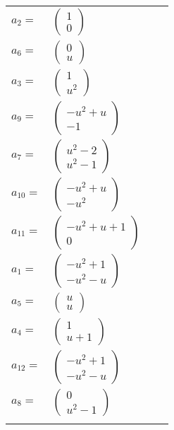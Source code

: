 \documentclass[1p]{elsarticle_modified}
\theoremstyle{definition}
\begin{document}
\begin{tabular}{m{7pt} m{180pt} m{7pt} m{180pt} }
\flushright $a_{2}=$&$\begin{pmatrix}1\\0\end{pmatrix}$ \\
\flushright $a_{6}=$&$\begin{pmatrix}0\\u\end{pmatrix}$ \\
\flushright $a_{3}=$&$\begin{pmatrix}1\\u^2\end{pmatrix}$ \\
\flushright $a_{9}=$&$\begin{pmatrix}- u^2+u\\-1\end{pmatrix}$ \\
\flushright $a_{7}=$&$\begin{pmatrix}u^2-2\\u^2-1\end{pmatrix}$ \\
\flushright $a_{10}=$&$\begin{pmatrix}- u^2+u\\- u^2\end{pmatrix}$ \\
\flushright $a_{11}=$&$\begin{pmatrix}- u^2+u+1\\0\end{pmatrix}$ \\
\flushright $a_{1}=$&$\begin{pmatrix}- u^2+1\\- u^2- u\end{pmatrix}$ \\
\flushright $a_{5}=$&$\begin{pmatrix}u\\u\end{pmatrix}$ \\
\flushright $a_{4}=$&$\begin{pmatrix}1\\u+1\end{pmatrix}$ \\
\flushright $a_{12}=$&$\begin{pmatrix}- u^2+1\\- u^2- u\end{pmatrix}$ \\
\flushright $a_{8}=$&$\begin{pmatrix}0\\u^2-1\end{pmatrix}$\\&\end{tabular}
\end{document}
